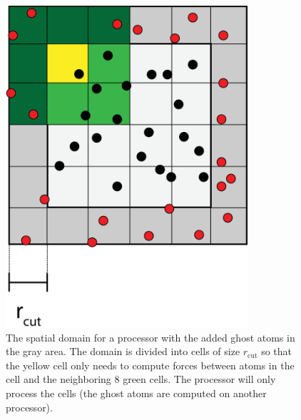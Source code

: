 \begin{figure}[h]
\begin{center}
\includegraphics[width=0.8\textwidth, trim=0cm 0cm 0cm 0cm, clip]{MD/figures/cells.eps}
\end{center}
\caption{The spatial domain for a processor with the added ghost atoms in the gray area. The domain is divided into cells of size $r_\text{cut}$ so that the yellow cell only needs to compute forces between atoms in the cell and the neighboring 8 green cells. The processor will only process the cells (the ghost atoms are computed on another processor).}
\label{fig:md_cells}
\end{figure}
